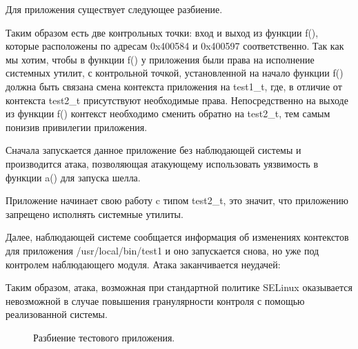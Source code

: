 Для приложения существует следующее разбиение.

Таким образом есть две контрольных точки: вход и выход из функции f(),
которые расположены по адресам 0x400584 и 0x400597 соответственно.
Так как мы хотим, чтобы в функции f() у приложения были права на
исполнение системных утилит, с контрольной точкой, установленной на
начало функции f() должна быть связана смена контекста приложения на
test1\_t, где, в отличие от контекста test2\_t присутствуют необходимые права.
Непосредственно на выходе из функции f() контекст необходимо сменить обратно на
test2\_t, тем самым понизив привилегии приложения.

Сначала запускается данное приложение без наблюдающей системы
и производится атака, позволяющая атакующему использовать уязвимость в функции
a() для запуска шелла.



Приложение начинает свою работу c типом test2\_t, это значит, что приложению
запрещено исполнять системные утилиты.

Далее, наблюдающей системе сообщается информация об изменениях
контекстов для приложения /usr/local/bin/test1 и оно запускается снова,
но уже под контролем наблюдающего модуля. Атака заканчивается неудачей:



Таким образом, атака, возможная при стандартной политике SELinux оказывается
невозможной в случае повышения гранулярности контроля с помощью реализованной
системы.

\begin{figure}
\centering
\subfloat{\label{fig:selinux}{}}
\caption{Разбиение тестового приложения.}
\end{figure}


